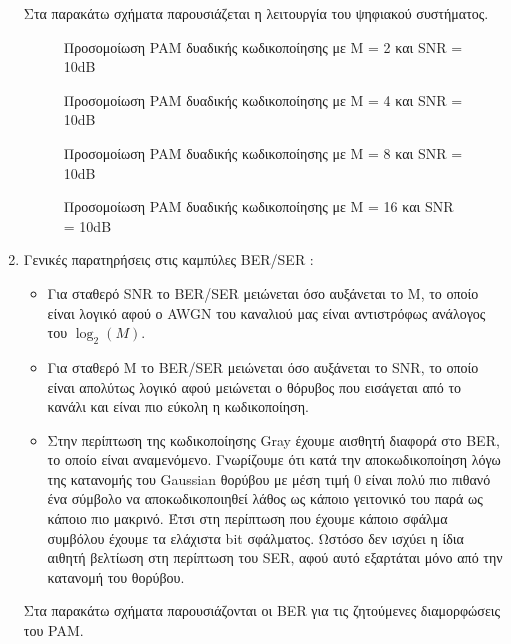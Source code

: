 \documentclass{article}
\begin{document}
\begin{enumerate}
    Στα παρακάτω σχήματα παρουσιάζεται η λειτουργία του ψηφιακού συστήματος.
        \begin{figure}[H]
        \caption{Προσομοίωση PAM δυαδικής κωδικοποίησης με M = 2 και SNR = 10dB}
        \end{figure}
        \begin{figure}[H]
        \caption{Προσομοίωση PAM δυαδικής κωδικοποίησης με M = 4 και SNR = 10dB}
        \end{figure}
        \begin{figure}[H]
        \caption{Προσομοίωση PAM δυαδικής κωδικοποίησης με M = 8 και SNR = 10dB}
        \end{figure}
        \begin{figure}[H]
        \caption{Προσομοίωση PAM δυαδικής κωδικοποίησης με M = 16 και SNR = 10dB}
        \end{figure}
    \item 
        Γενικές παρατηρήσεις στις καμπύλες BER/SER :
        \begin{itemize}
            \item Για σταθερό SNR το BER/SER μειώνεται όσο αυξάνεται το M, το οποίο είναι λογικό αφού ο AWGN του καναλιού μας είναι αντιστρόφως ανάλογος του $\log_2(M)$.
            \item Για σταθερό M το BER/SER μειώνεται όσο αυξάνεται το SNR, το οποίο είναι απολύτως λογικό αφού μειώνεται ο θόρυβος που εισάγεται από το κανάλι και είναι πιο εύκολη η κωδικοποίηση.
            \item Στην περίπτωση της κωδικοποίησης Gray έχουμε αισθητή διαφορά στο BER, το οποίο είναι αναμενόμενο. Γνωρίζουμε ότι κατά την αποκωδικοποίηση λόγω της κατανομής του Gaussian θορύβου με μέση τιμή 0 είναι πολύ πιο πιθανό ένα σύμβολο να αποκωδικοποιηθεί λάθος ως κάποιο γειτονικό του παρά ως κάποιο πιο μακρινό. Έτσι στη περίπτωση που έχουμε κάποιο σφάλμα συμβόλου έχουμε τα ελάχιστα bit σφάλματος. Ωστόσο δεν ισχύει η ίδια αιθητή βελτίωση στη περίπτωση του SER, αφού αυτό εξαρτάται μόνο από την κατανομή του θορύβου.
        \end{itemize}
        
        Στα παρακάτω σχήματα παρουσιάζονται οι ΒER για τις ζητούμενες διαμορφώσεις του PAM.


\end{enumerate}
\end{document}
